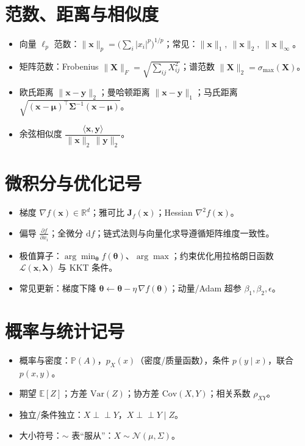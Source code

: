 \documentclass[UTF8,zihao=-4]{ctexart}
\newcommand{\R}{\mathbb{R}}
\newcommand{\E}{\mathbb{E}}
\newcommand{\Var}{\mathrm{Var}}
\newcommand{\Cov}{\mathrm{Cov}}
\newcommand{\Prob}{\mathbb{P}}
\newcommand{\1}{\mathbf{1}}
\newcommand{\0}{\mathbf{0}}
\newcommand{\indep}{\perp\!\!\!\perp}
\begin{document}
\section{范数、距离与相似度}
\begin{itemize}
  \item 向量 $\ell_p$ 范数：$\lVert\bm{x}\rVert_p=\big(\sum_i |x_i|^p\big)^{1/p}$；常见：$\lVert\bm{x}\rVert_1,\ \lVert\bm{x}\rVert_2,\ \lVert\bm{x}\rVert_\infty$。
  \item 矩阵范数：Frobenius $\lVert\bm{X}\rVert_F=\sqrt{\sum_{ij} X_{ij}^2}$；谱范数 $\lVert\bm{X}\rVert_2=\sigma_{\max}(\bm{X})$。
  \item 欧氏距离 $\lVert\bm{x}-\bm{y}\rVert_2$；曼哈顿距离 $\lVert\bm{x}-\bm{y}\rVert_1$；马氏距离 $\sqrt{(\bm{x}-\bm{\mu})^\top\bm{\Sigma}^{-1}(\bm{x}-\bm{\mu})}$。
  \item 余弦相似度 $\dfrac{\langle\bm{x},\bm{y}\rangle}{\lVert\bm{x}\rVert_2\,\lVert\bm{y}\rVert_2}$。
\end{itemize}

\section{微积分与优化记号}
\begin{itemize}
  \item 梯度 $\nabla f(\bm{x})\in\R^d$；雅可比 $\bm{J}_f(\bm{x})$；Hessian $\nabla^2 f(\bm{x})$。
  \item 偏导 $\tfrac{\partial f}{\partial x_i}$；全微分 $\mathrm{d}f$；链式法则与向量化求导遵循矩阵维度一致性。
  \item 极值算子：$\arg\min_{\bm{\theta}} f(\bm{\theta})$、$\arg\max$；约束优化用拉格朗日函数 $\mathcal{L}(\bm{x},\bm{\lambda})$ 与 KKT 条件。
  \item 常见更新：梯度下降 $\bm{\theta}\leftarrow\bm{\theta}-\eta\,\nabla f(\bm{\theta})$；动量/Adam 超参 $\beta_1,\beta_2,\epsilon$。
\end{itemize}

\section{概率与统计记号}
\begin{itemize}
  \item 概率与密度：$\Prob(A)$，$p_X(x)$（密度/质量函数），条件 $p(y\mid x)$，联合 $p(x,y)$。
  \item 期望 $\E[Z]$；方差 $\Var(Z)$；协方差 $\Cov(X,Y)$；相关系数 $\rho_{XY}$。
  \item 独立/条件独立：$X\indep Y$，$X\indep Y\mid Z$。
  \item 大小符号：$\sim$ 表“服从”：$X\sim\mathcal{N}(\mu,\Sigma)$。
\end{itemize}
\end{document}
